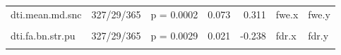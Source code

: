 \documentclass[
  table]{article}
\begin{document}
\begin{landscape}
\begin{table}
\begin{tabular}[t]{lllrrll}
dti.mean.md.snc & 327/29/365 & p = 0.0002 & 0.073 & 0.311 & fwe.x & fwe.y\\
\cellcolor{gray!22}{dti.mean.md.deep.snc} & \cellcolor{gray!22}{327/29/365} & \cellcolor{gray!22}{p = 0.0005} & \cellcolor{gray!22}{0.057} & \cellcolor{gray!22}{0.290} & \cellcolor{gray!22}{fwe.x} & \cellcolor{gray!22}{fwe.y}\\
dti.fa.bn.str.pu & 327/29/365 & p = 0.0029 & 0.021 & -0.238 & fdr.x & fdr.y\\
\cellcolor{gray!22}{rsf.p2.sommotb.2.striatum} & \cellcolor{gray!22}{327/26/277} & \cellcolor{gray!22}{p = 0.0035} & \cellcolor{gray!22}{0.199} & \cellcolor{gray!22}{0.235} & \cellcolor{gray!22}{fdr.x} & \cellcolor{gray!22}{n.s.}\\
\bottomrule
\end{tabular}
\end{table}
\end{landscape}
\end{document}
